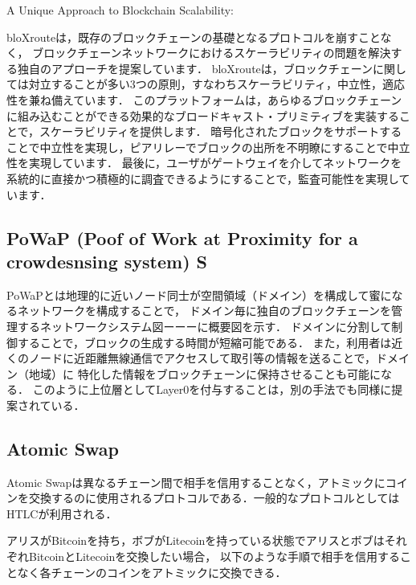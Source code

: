 \documentclass[a4paper,12pt]{jsarticle}
\begin{document}
A Unique Approach to Blockchain Scalability: %

bloXrouteは，既存のブロックチェーンの基礎となるプロトコルを崩すことなく，
ブロックチェーンネットワークにおけるスケーラビリティの問題を解決する独自のアプローチを提案しています．
bloXrouteは，ブロックチェーンに関しては対立することが多い3つの原則，すなわちスケーラビリティ，中立性，適応性を兼ね備えています．
このプラットフォームは，あらゆるブロックチェーンに組み込むことができる効果的なブロードキャスト・プリミティブを実装することで，スケーラビリティを提供します．
暗号化されたブロックをサポートすることで中立性を実現し，ピアリレーでブロックの出所を不明瞭にすることで中立性を実現しています．
最後に，ユーザがゲートウェイを介してネットワークを系統的に直接かつ積極的に調査できるようにすることで，監査可能性を実現しています．


      \subsection{PoWaP (Poof of Work at Proximity for a crowdesnsing system) S}
PoWaPとは地理的に近いノード同士が空間領域（ドメイン）を構成して蜜になるネットワークを構成することで，
ドメイン毎に独自のブロックチェーンを管理するネットワークシステム図ーーーに概要図を示す．
ドメインに分割して制御することで，ブロックの生成する時間が短縮可能である．
また，利用者は近くのノードに近距離無線通信でアクセスして取引等の情報を送ることで，ドメイン（地域）に
特化した情報をブロックチェーンに保持させることも可能になる．
このように上位層としてLayer0を付与することは，別の手法でも同様に提案されている\cite{bloX}．

\subsection{Atomic Swap}

Atomic Swapは異なるチェーン間で相手を信用することなく，アトミックにコインを交換するのに使用されるプロトコルである．一般的なプロトコルとしてはHTLCが利用される．

アリスがBitcoinを持ち，ボブがLitecoinを持っている状態でアリスとボブはそれぞれBitcoinとLitecoinを交換したい場合，
以下のような手順で相手を信用することなく各チェーンのコインをアトミックに交換できる．
\end{document}

